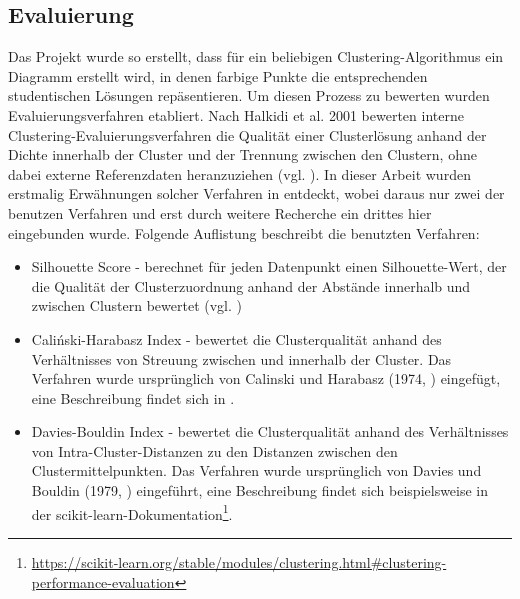\subsection{Evaluierung}
Das Projekt wurde so erstellt, dass für ein beliebigen Clustering-Algorithmus ein Diagramm erstellt wird, in denen farbige Punkte die entsprechenden studentischen Lösungen repäsentieren. Um diesen Prozess zu bewerten wurden Evaluierungsverfahren etabliert. Nach Halkidi et al. 2001 bewerten interne Clustering-Evaluierungsverfahren die Qualität einer Clusterlösung anhand der Dichte innerhalb der Cluster und der Trennung zwischen den Clustern, ohne dabei externe Referenzdaten heranzuziehen (vgl. \cite{Halkidi.2001}). In dieser Arbeit wurden erstmalig Erwähnungen solcher Verfahren in \cite{YoussefLahmadiMohammedZakariaeElKhattabiMouniaRahhaliLahcenOughdir.2024} entdeckt, wobei daraus nur zwei der benutzen Verfahren und erst durch weitere Recherche ein drittes hier eingebunden wurde. Folgende Auflistung beschreibt die benutzten Verfahren:
\begin{itemize}
    \item Silhouette Score - berechnet für jeden Datenpunkt einen Silhouette-Wert, der die Qualität der Clusterzuordnung anhand der Abstände innerhalb und zwischen Clustern bewertet (vgl. \cite{Rousseeuw.1987})
    \item Caliński-Harabasz Index - bewertet die Clusterqualität anhand des Verhältnisses von Streuung zwischen und innerhalb der Cluster. Das Verfahren wurde ursprünglich von Calinski und Harabasz (1974,  \cite{CalinskiT.andHarabaszJ..1974}) eingefügt, eine Beschreibung findet sich in \cite{Halkidi.2001}.
    \item Davies-Bouldin Index - bewertet die Clusterqualität anhand des Verhältnisses von Intra-Cluster-Distanzen zu den Distanzen zwischen den Clustermittelpunkten. Das Verfahren wurde ursprünglich von Davies und Bouldin (1979, \cite{Davies.1979}) eingeführt, eine Beschreibung findet sich beispielsweise in der scikit-learn-Dokumentation\footnote{\url{https://scikit-learn.org/stable/modules/clustering.html\#clustering-performance-evaluation}}.
\end{itemize}


